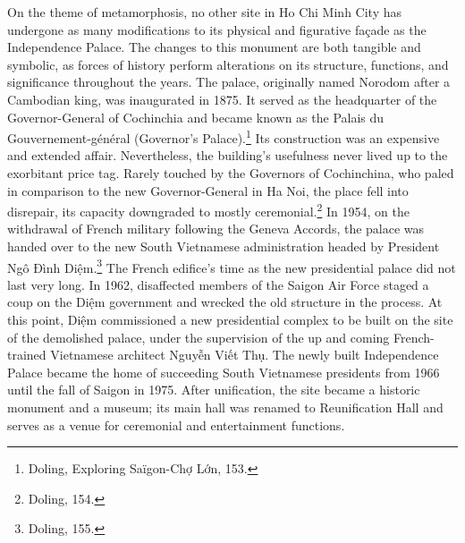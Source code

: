 \vi On the theme of metamorphosis, no other site in Ho Chi Minh City has undergone as many modifications to its physical and figurative façade as the Independence Palace. The changes to this monument are both tangible and symbolic, as forces of history perform alterations on its structure, functions, and significance throughout the years. The palace, originally named Norodom after a Cambodian king, was inaugurated in 1875. It served as the headquarter of the Governor-General of Cochinchia and became known as the Palais du Gouvernement-général (Governor’s Palace).\footnote{Doling, Exploring Saïgon-Chợ Lớn, 153.} Its construction was an expensive and extended affair. Nevertheless, the building’s usefulness never lived up to the exorbitant price tag. Rarely touched by the Governors of Cochinchina, who paled in comparison to the new Governor-General in Ha Noi, the place fell into disrepair, its capacity downgraded to mostly ceremonial.\footnote{Doling, 154.} In 1954, on the withdrawal of French military following the Geneva Accords, the palace was handed over to the new South Vietnamese administration headed by President Ngô Đình Diệm.\footnote{Doling, 155.} The French edifice’s time as the new presidential palace did not last very long. In 1962, disaffected members of the Saigon Air Force staged a coup on the Diệm government and wrecked the old structure in the process. At this point, Diệm commissioned a new presidential complex to be built on the site of the demolished palace, under the supervision of the up and coming French-trained Vietnamese architect Nguyễn Viết Thụ. The newly built Independence Palace became the home of succeeding South Vietnamese presidents from 1966 until the fall of Saigon in 1975. After unification, the site became a historic monument and a museum; its main hall was renamed to Reunification Hall and serves as a venue for ceremonial and entertainment functions.

